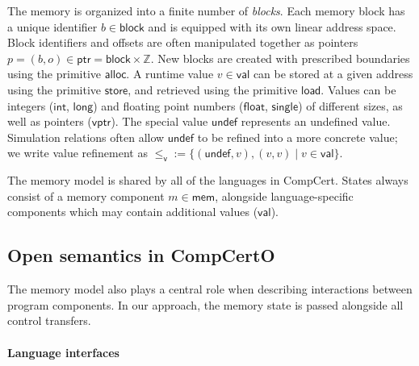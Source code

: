 \documentclass[sigplan,screen,review]{acmart}
\newcommand{\kw}[1]{\ensuremath{ \mathsf{#1} }}
\newcommand{\vref}{\le_\kw{v}}
\begin{document}
The memory is organized into a finite number of \emph{blocks}.
Each memory block has a unique identifier $b \in \kw{block}$
and is equipped with its own linear address space.
Block identifiers and offsets are often manipulated together
as pointers $p = (b, o) \in \kw{ptr} = \kw{block} \times \mathbb{Z}$.
New blocks are created with prescribed boundaries
using the primitive $\kw{alloc}$.
A runtime value $v \in \kw{val}$ can be stored at
a given address using the primitive \kw{store},
and retrieved using the primitive \kw{load}.
Values can be integers (\kw{int}, \kw{long}) and
floating point numbers (\kw{float}, \kw{single})
of different sizes,
as well as pointers (\kw{vptr}).
The special value \kw{undef}
represents an undefined value.
Simulation relations
often allow $\kw{undef}$
to be refined into a more concrete value;
we write value refinement as
${\vref} := \{(\kw{undef}, v), (v, v) \mid v \in \kw{val}\}$.

The memory model is shared by all of the languages in CompCert.
States always consist of
a memory component $m \in \kw{mem}$,
alongside language-specific components
which may contain additional values ($\kw{val}$).



\subsection{Open semantics in CompCertO} \label{sec:sem:open} %

The memory model also plays a central role
when describing interactions between program components.
In our approach, %
the memory state is passed %
alongside all control transfers.

\paragraph{Language interfaces} %
\end{document}
